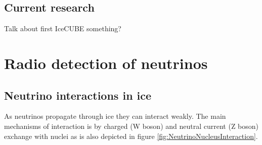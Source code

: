 \documentclass[11pt,a4paper,faculty=we,language=en,doctype=report]{cls/ugent-doc}
\begin{document}
\section{Current research}
Talk about first IceCUBE something?
\newpage
\chapter{Radio detection of neutrinos}
\section{Neutrino interactions in ice}
As neutrinos propagate through ice they can interact weakly. The main
mechanisms of interaction is by charged (W boson) and neutral current (Z boson)
exchange with nuclei \cite{NuRadioMc} as is also depicted in figure
\ref{fig:NeutrinoNucleusInteraction}.
\end{document}
